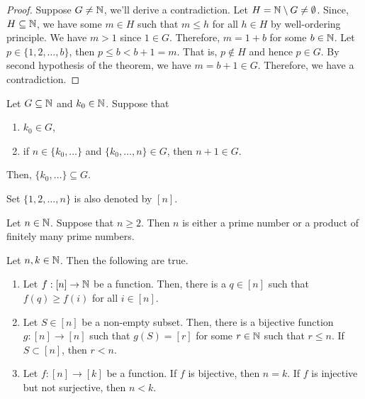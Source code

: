\documentclass[a4paper,english,12pt]{article}
\begin{document}
\begin{proof} Suppose $G \neq \mathbb{N}$, we'll derive a contradiction. Let $H = \mathbb{N} \setminus G \neq \emptyset$. Since, $H \subseteq \mathbb{N}$, we have some $m \in H$ such that $m \leq h$ for all $h \in H$ by well-ordering principle. We have $m > 1$ since $1 \in G$. Therefore, $m = 1 +b$ for some $b \in \mathbb{N}$. Let $p \in \{1,2,\ldots,b\}$, then $p \leq b < b+1 = m$. That is, $p \notin H$ and hence $p \in G$. By second hypothesis of the theorem, we have $m = b+1 \in G$. Therefore, we have a contradiction.
\end{proof}
\begin{thm} Let $G \subseteq \mathbb{N}$ and $k_0 \in \mathbb{N}$. Suppose that
\begin{enumerate}
	\item $k_0 \in G$,
	\item if $n \in \{k_0,\ldots\}$ and $\{k_0, \ldots, n\} \in G$, then $n+1 \in G$.
\end{enumerate}
Then, $\{k_0,\ldots\} \subseteq G$.
\end{thm}
\begin{defn} Set $\{1,2,\ldots,n\}$ is also denoted by $[n]$.
\end{defn}
\begin{exmp} Let $n \in \mathbb{N}$. Suppose that $n \geq 2$. Then $n$ is either a prime number or a product of finitely many prime numbers.
\end{exmp}
\begin{thm} Let $n,k \in \mathbb{N}$. Then the following are true.
\begin{enumerate}
	\item Let $f:[n] \to \mathbb{N}$ be a function. Then, there is a $q \in [n]$ such that $f(q) \geq f(i)$ for all $i \in [n]$.
	\item Let $S \in [n]$ be a non-empty subset. Then, there is a bijective function $g: [n] \to [n]$ such that $g(S) = [r]$ for some $r \in \mathbb{N}$ such that $r \leq n$. If $S \subset [n]$, then $r < n$.
	\item Let $f: [n] \to [k]$ be a function. If $f$ is bijective, then $n = k$. If $f$ is injective but not surjective, then $n < k$.
\end{enumerate}
\end{thm}
\end{document}
